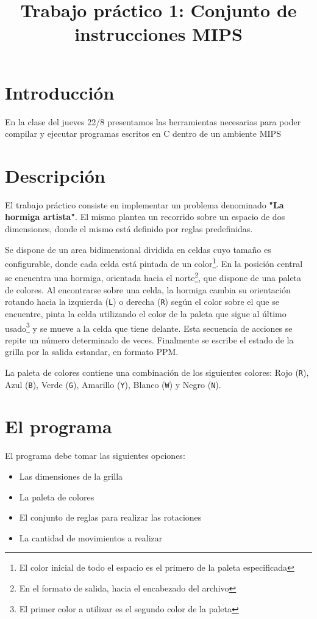\documentclass{article}
\author{}
\title{Trabajo práctico 1: Conjunto de instrucciones MIPS}
\begin{document}
\date{}
\maketitle

\section{Introducción}

En la clase del jueves 22/8 presentamos las herramientas necesarias para poder compilar y ejecutar
programas escritos en C dentro de un ambiente MIPS

\section{Descripción}
El trabajo práctico consiste en implementar un problema denominado \textbf{"La hormiga artista"}. El mismo plantea un recorrido
sobre un espacio de dos dimensiones, donde el mismo está definido por reglas predefinidas.

Se dispone de un area bidimensional dividida en celdas cuyo tamaño es configurable, donde cada celda está pintada de un color\footnote{El color inicial de todo el espacio es el primero de la paleta especificada}. En la posición central se encuentra una
hormiga, orientada hacia el norte\footnote{En el formato de salida, hacia el encabezado del archivo}, que dispone de una paleta de colores. 
Al encontrarse sobre una celda, la hormiga cambia su orientación rotando hacia la izquierda (\texttt{L}) o derecha (\texttt{R}) según el 
color sobre el que se encuentre, pinta la celda utilizando el color de la paleta que sigue al último usado\footnote{El primer color a utilizar es el segundo 
color de la paleta} y se mueve a la celda que tiene delante. Esta secuencia de acciones se repite un número determinado de veces.
Finalmente se escribe el estado de la grilla por la salida estandar, en formato PPM.

La paleta de colores contiene una combinación de los siguientes colores: 
Rojo (\texttt{R}), Azul (\texttt{B}), Verde (\texttt{G}), Amarillo (\texttt{Y}), Blanco (\texttt{W}) y Negro (\texttt{N}).

\pagebreak
\section{El programa}

El programa debe tomar las siguientes opciones:
\begin{itemize}
\item Las dimensiones de la grilla
\item La paleta de colores
\item El conjunto de reglas para realizar las rotaciones
\item La cantidad de movimientos a realizar
\end{itemize}
\end{document}

